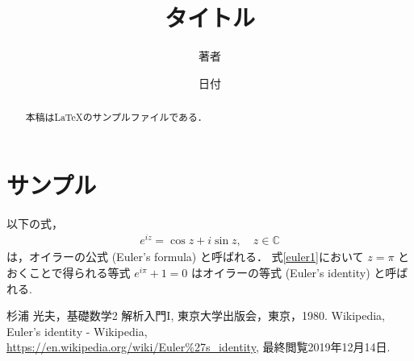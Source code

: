 \documentclass[twocolumn, uplatex, dvipdfmx]{jsarticle}
\title{タイトル}
\author{著者}
\date{日付}
\begin{document}
\maketitle

\begin{abstract}
	本稿は\LaTeX{}のサンプルファイルである．
\end{abstract}

\section{サンプル}

以下の式，
\begin{align}
	e^{iz}=\cos z+i\sin z,\quad z\in\mathbb{C}\label{euler1}
\end{align}
は，オイラーの公式 (Euler's formula) %
%
と呼ばれる\cite{sugiura:1980:1}．
式\eqref{euler1}において $z=\pi$ とおくことで得られる等式 $e^{i\pi}+1=0$ はオイラーの等式 (Euler's identity) %
%
と呼ばれる\cite{wiki:eulersidentity}.

\begin{thebibliography}{9}
	 杉浦 光夫，基礎数学2 解析入門I, 東京大学出版会，東京，1980.
	 Wikipedia, Euler's identity - Wikipedia, \\\url{https://en.wikipedia.org/wiki/Euler%27s_identity}, 最終閲覧2019年12月14日.
\end{thebibliography}

\printindex
\end{document}
